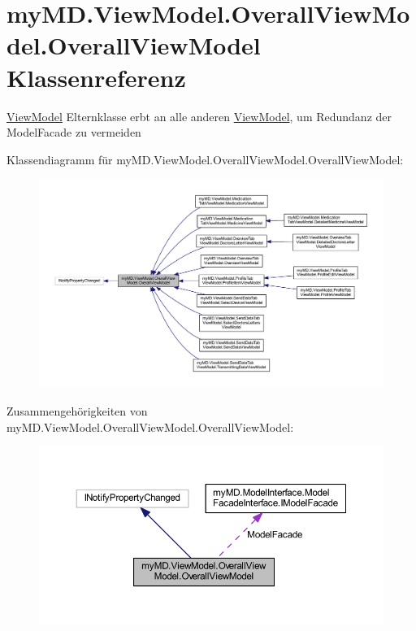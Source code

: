 \hypertarget{classmy_m_d_1_1_view_model_1_1_overall_view_model_1_1_overall_view_model}{}\section{my\+M\+D.\+View\+Model.\+Overall\+View\+Model.\+Overall\+View\+Model Klassenreferenz}
\label{classmy_m_d_1_1_view_model_1_1_overall_view_model_1_1_overall_view_model}


\mbox{\hyperlink{namespacemy_m_d_1_1_view_model}{View\+Model}} Elternklasse erbt an alle anderen \mbox{\hyperlink{namespacemy_m_d_1_1_view_model}{View\+Model}}, um Redundanz der Model\+Facade zu vermeiden  




Klassendiagramm für my\+M\+D.\+View\+Model.\+Overall\+View\+Model.\+Overall\+View\+Model\+:
\nopagebreak
\begin{figure}[H]
\begin{center}
\leavevmode
\includegraphics[width=350pt]{classmy_m_d_1_1_view_model_1_1_overall_view_model_1_1_overall_view_model__inherit__graph}
\end{center}
\end{figure}


Zusammengehörigkeiten von my\+M\+D.\+View\+Model.\+Overall\+View\+Model.\+Overall\+View\+Model\+:
\nopagebreak
\begin{figure}[H]
\begin{center}
\leavevmode
\includegraphics[width=350pt]{classmy_m_d_1_1_view_model_1_1_overall_view_model_1_1_overall_view_model__coll__graph}
\end{center}
\end{figure}
